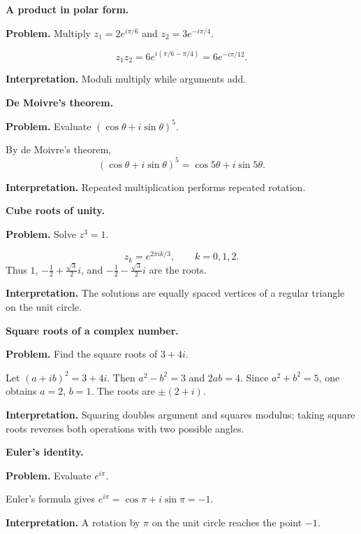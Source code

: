 \begin{workedexample}
\textbf{A product in polar form.}\par
\textbf{Problem.} Multiply $z_1=2e^{i\pi/6}$ and $z_2=3e^{-i\pi/4}$.
\begin{solution}
\[
z_1z_2=6e^{i(\pi/6-\pi/4)}=6e^{-i\pi/12}.
\]

\textbf{Interpretation.} Moduli multiply while arguments add.
\end{solution}
\end{workedexample}

\begin{workedexample}
\textbf{De Moivre's theorem.}\par
\textbf{Problem.} Evaluate $(\cos\theta+i\sin\theta)^5$.
\begin{solution}
By de Moivre's theorem,
\[
(\cos\theta+i\sin\theta)^5=\cos5\theta+i\sin5\theta.
\]

\textbf{Interpretation.} Repeated multiplication performs repeated rotation.
\end{solution}
\end{workedexample}

\begin{workedexample}
\textbf{Cube roots of unity.}\par
\textbf{Problem.} Solve $z^3=1$.
\begin{solution}
\[
z_k=e^{2\pi i k/3},\qquad k=0,1,2.
\]
Thus $1$, $-\tfrac12+\tfrac{\sqrt3}{2}i$, and $-\tfrac12-\tfrac{\sqrt3}{2}i$ are the roots.

\textbf{Interpretation.} The solutions are equally spaced vertices of a regular triangle on the unit circle.
\end{solution}
\end{workedexample}

\begin{workedexample}
\textbf{Square roots of a complex number.}\par
\textbf{Problem.} Find the square roots of $3+4i$.
\begin{solution}
Let $(a+ib)^2=3+4i$. Then $a^2-b^2=3$ and $2ab=4$. Since $a^2+b^2=5$, one obtains $a=2$, $b=1$. The roots are $\pm(2+i)$.

\textbf{Interpretation.} Squaring doubles argument and squares modulus; taking square roots reverses both operations with two possible angles.
\end{solution}
\end{workedexample}

\begin{workedexample}
\textbf{Euler's identity.}\par
\textbf{Problem.} Evaluate $e^{i\pi}$.
\begin{solution}
Euler's formula gives $e^{i\pi}=\cos\pi+i\sin\pi=-1$.

\textbf{Interpretation.} A rotation by $\pi$ on the unit circle reaches the point $-1$.
\end{solution}
\end{workedexample}


